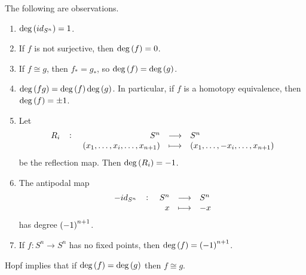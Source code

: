 \begin{proposition}
The following are observations.
\begin{enumerate}
\item $ \deg\br{id_{S^n}} = 1 $.
\item If $ f $ is not surjective, then $ \deg\br{f} = 0 $.
\item If $ f \cong g $, then $ f_* = g_* $, so $ \deg\br{f} = \deg\br{g} $.
\item $ \deg\br{fg} = \deg\br{f}\deg\br{g} $. In particular, if $ f $ is a homotopy equivalence, then $ \deg\br{f} = \pm 1 $.
\item Let
$$ \function[R_i]{S^n}{S^n}{\br{x_1, \dots, x_i, \dots, x_{n + 1}}}{\br{x_1, \dots, -x_i, \dots, x_{n + 1}}} $$
be the reflection map. Then $ \deg\br{R_i} = -1 $.
\item The antipodal map
$$ \function[-id_{S^n}]{S^n}{S^n}{x}{-x} $$
has degree $ \br{-1}^{n + 1} $.
\item If $ f : S^n \to S^n $ has no fixed points, then $ \deg\br{f} = \br{-1}^{n + 1} $.
\end{enumerate}
\end{proposition}

Hopf implies that if $ \deg\br{f} = \deg\br{g} $ then $ f \cong g $.

